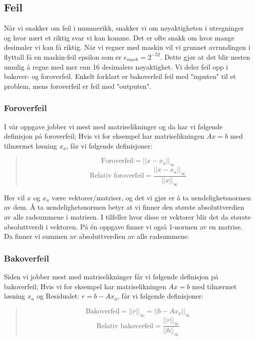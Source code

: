 \subsection{Feil}
Når vi snakker om feil i nummerikk, snakker vi om nøyaktigheten i utregninger og hvor nært et riktig svar vi kan komme. Det er ofte snakk om hvor mange desimaler vi kan få riktig. Når vi regner med maskin vil vi grunnet avrundingen i flyttall få en maskin-feil epsilon som er $\epsilon_{mach} = 2^{-52}$. Dette gjør at det blir nesten umulig å regne med mer enn 16 desimalers nøyaktighet. Vi deler feil opp i bakover- og foroverfeil. Enkelt forklart er bakoverfeil feil med "inputen" til et problem, mens foroverfeil er feil med "outputen".

\subsubsection{Foroverfeil}
I vår oppgave jobber vi mest med matriselikninger og da har vi følgende definisjon på foroverfeil; Hvis vi for eksempel har matriselikningen $Ax = b$ med tilnærmet løsning $x_a$, får vi følgende definisjoner: 
\begin{quote}	
\begin{equation*}
\mbox{Foroverfeil} = ||x - x_a||_{\infty}
\end{equation*}
\begin{equation*}
\mbox{Relativ foroverfeil} = \frac{||x - x_a||_{\infty}}{||x||_{\infty}}
\end{equation*}
\end{quote}
Her vil $x$ og $x_a$ være vektorer/matriser, og det vi gjør er å ta uendelighetsnormen av dem. Å ta uendelighetsnormen betyr at vi finner den største absoluttverdien av alle radsummene i matrisen. I tilfeller hvor disse er vektorer blir det da største absoluttverdi i vektoren. På én oppgave finner vi også 1-normen av en matrise. Da finner vi summen av absoluttverdien av alle radsummene.

\subsubsection{Bakoverfeil}
Siden vi jobber mest med matriselikninger får vi følgende definisjon på bakoverfeil; Hvis vi for eksempel har matriselikningen $Ax = b$ med tilnærmet løsning $x_a$ og Residualet: $r = b - Ax_a$, får vi følgende definisjoner:
\begin{quote}	
\begin{equation*}
\mbox{Bakoverfeil} = ||r||_{\infty} = ||b-Ax_a||_{\infty}
\end{equation*}
\begin{equation*}
\mbox{Relativ bakoverfeil} = \frac{||r||_{\infty}}{||b||_{\infty}}
\end{equation*}
\end{quote}

